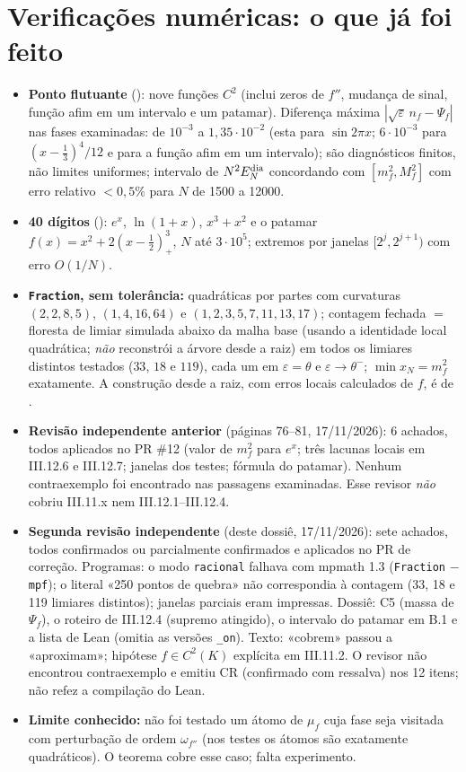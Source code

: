 \documentclass[11pt,a4paper]{article}
\newcommand{\Edia}{E_N^{\rm dia}}
\begin{document}
\section{Verificações numéricas: o que já foi feito}
\begin{itemize}[leftmargin=1.6em]
\item \textbf{Ponto flutuante} (): nove funções $C^2$ (inclui zeros de $f''$, mudança de sinal, função afim em um intervalo e um patamar). Diferença máxima $|\sqrt\varepsilon\,n_f-\Psi_f|$ nas fases examinadas: de $10^{-3}$ a $1{,}35\cdot10^{-2}$ (esta para $\sin2\pi x$; $6\cdot10^{-3}$ para $(x-\tfrac13)^4/12$ e para a função afim em um intervalo); são diagnósticos finitos, não limites uniformes; intervalo de $N^2\Edia$ concordando com $[m_f^2,M_f^2]$ com erro relativo $<0{,}5\%$ para $N$ de 1500 a 12000.
\item \textbf{40 dígitos} (): $e^x$, $\ln(1+x)$, $x^3+x^2$ e o patamar $f(x)=x^2+2(x-\tfrac12)_+^3$, $N$ até $3\cdot10^5$; extremos por janelas $[2^j,2^{j+1})$ com erro $O(1/N)$.
\item \textbf{\texttt{Fraction}, sem tolerância:} quadráticas por partes com curvaturas $(2,2,8,5)$, $(1,4,16,64)$ e $(1,2,3,5,7,11,13,17)$; contagem fechada $=$ floresta de limiar simulada abaixo da malha base (usando a identidade local quadrática; \emph{não} reconstrói a árvore desde a raiz) em todos os limiares distintos testados ($33$, $18$ e $119$), cada um em $\varepsilon=\theta$ e $\varepsilon\to\theta^-$; $\min x_N=m_f^2$ exatamente. A construção desde a raiz, com erros locais calculados de $f$, é de .
\item \textbf{Revisão independente anterior} (páginas 76--81, 17/11/2026): 6 achados, todos aplicados no PR \#12 (valor de $m_f^2$ para $e^x$; três lacunas locais em III.12.6 e III.12.7; janelas dos testes; fórmula do patamar). Nenhum contraexemplo foi encontrado nas passagens examinadas. Esse revisor \emph{não} cobriu III.11.x nem III.12.1--III.12.4.
\item \textbf{Segunda revisão independente} (deste dossiê, 17/11/2026): sete achados, todos confirmados ou parcialmente confirmados e aplicados no PR de correção. Programas: o modo \texttt{racional} falhava com mpmath 1.3 (\texttt{Fraction} $-$ \texttt{mpf}); o literal «250 pontos de quebra» não correspondia à contagem (33, 18 e 119 limiares distintos); janelas parciais eram impressas. Dossiê: C5 (massa de $\Psi_f$), o roteiro de III.12.4 (supremo atingido), o intervalo do patamar em B.1 e a lista de Lean (omitia as versões \texttt{\_on}). Texto: «cobrem» passou a «aproximam»; hipótese $f\in C^2(K)$ explícita em III.11.2. O revisor não encontrou contraexemplo e emitiu CR (confirmado com ressalva) nos 12 itens; não refez a compilação do Lean.
\item \textbf{Limite conhecido:} não foi testado um átomo de $\mu_f$ cuja fase seja visitada com perturbação de ordem $\omega_{f''}$ (nos testes os átomos são exatamente quadráticos). O teorema cobre esse caso; falta experimento.
\end{itemize}
\end{document}
